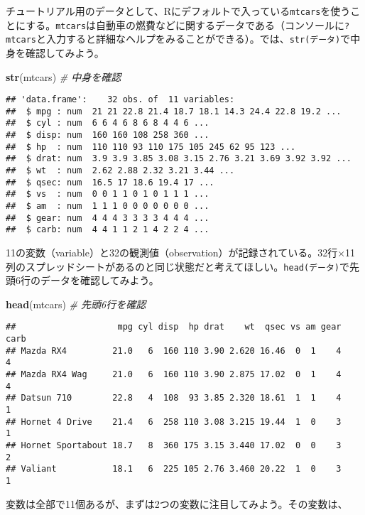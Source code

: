 \documentclass[]{book}
\newenvironment{Shaded}{\begin{snugshade}}{\end{snugshade}}
\newcommand{\KeywordTok}[1]{\textcolor[rgb]{0.13,0.29,0.53}{\textbf{#1}}}
\newcommand{\CommentTok}[1]{\textcolor[rgb]{0.56,0.35,0.01}{\textit{#1}}}
\newcommand{\NormalTok}[1]{#1}
\begin{document}
チュートリアル用のデータとして、Rにデフォルトで入っている\texttt{mtcars}を使うことにする。\texttt{mtcars}は自動車の燃費などに関するデータである（コンソールに\texttt{?mtcars}と入力すると詳細なヘルプをみることができる）。では、\texttt{str(データ)}で中身を確認してみよう。

\begin{Shaded}
\begin{Highlighting}[]
\KeywordTok{str}\NormalTok{(mtcars) }\CommentTok{# 中身を確認}
\end{Highlighting}
\end{Shaded}

\begin{verbatim}
## 'data.frame':    32 obs. of  11 variables:
##  $ mpg : num  21 21 22.8 21.4 18.7 18.1 14.3 24.4 22.8 19.2 ...
##  $ cyl : num  6 6 4 6 8 6 8 4 4 6 ...
##  $ disp: num  160 160 108 258 360 ...
##  $ hp  : num  110 110 93 110 175 105 245 62 95 123 ...
##  $ drat: num  3.9 3.9 3.85 3.08 3.15 2.76 3.21 3.69 3.92 3.92 ...
##  $ wt  : num  2.62 2.88 2.32 3.21 3.44 ...
##  $ qsec: num  16.5 17 18.6 19.4 17 ...
##  $ vs  : num  0 0 1 1 0 1 0 1 1 1 ...
##  $ am  : num  1 1 1 0 0 0 0 0 0 0 ...
##  $ gear: num  4 4 4 3 3 3 3 4 4 4 ...
##  $ carb: num  4 4 1 1 2 1 4 2 2 4 ...
\end{verbatim}

11の変数（variable）と32の観測値（observation）が記録されている。32行×11列のスプレッドシートがあるのと同じ状態だと考えてほしい。\texttt{head(データ)}で先頭6行のデータを確認してみよう。

\begin{Shaded}
\begin{Highlighting}[]
\KeywordTok{head}\NormalTok{(mtcars) }\CommentTok{# 先頭6行を確認}
\end{Highlighting}
\end{Shaded}

\begin{verbatim}
##                    mpg cyl disp  hp drat    wt  qsec vs am gear carb
## Mazda RX4         21.0   6  160 110 3.90 2.620 16.46  0  1    4    4
## Mazda RX4 Wag     21.0   6  160 110 3.90 2.875 17.02  0  1    4    4
## Datsun 710        22.8   4  108  93 3.85 2.320 18.61  1  1    4    1
## Hornet 4 Drive    21.4   6  258 110 3.08 3.215 19.44  1  0    3    1
## Hornet Sportabout 18.7   8  360 175 3.15 3.440 17.02  0  0    3    2
## Valiant           18.1   6  225 105 2.76 3.460 20.22  1  0    3    1
\end{verbatim}

変数は全部で11個あるが、まずは2つの変数に注目してみよう。その変数は、
\end{document}
